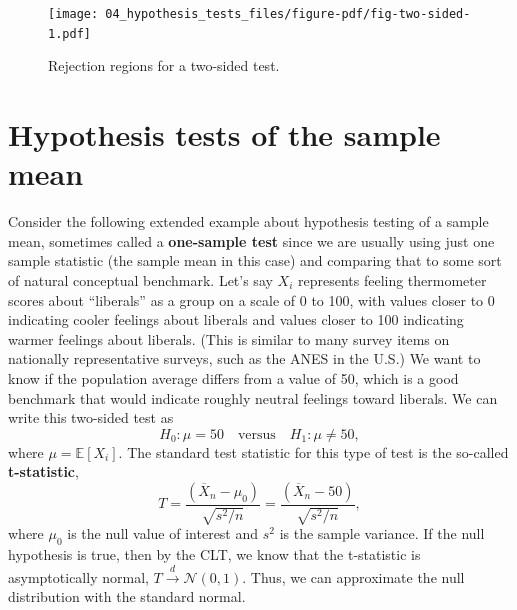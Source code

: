 \documentclass[
  letterpaper,
  DIV=11,
  numbers=noendperiod]{scrreprt}
\newcommand{\E}{\mathbb{E}}
\newcommand{\N}{\mathcal{N}}
\newcommand{\Xbar}{\overline{X}}
\newcommand{\indist}{\overset{d}{\to}}
\theoremstyle{definition}
\theoremstyle{definition}
\theoremstyle{plain}
\theoremstyle{remark}
\begin{document}
\begin{figure}

{\centering \texttt{[image: 04\_hypothesis\_tests\_files/figure-pdf/fig-two-sided-1.pdf]}

}

\caption{\label{fig-two-sided}Rejection regions for a two-sided test.}

\end{figure}

\hypertarget{hypothesis-tests-of-the-sample-mean}{%
\section{Hypothesis tests of the sample
mean}\label{hypothesis-tests-of-the-sample-mean}}

Consider the following extended example about hypothesis testing of a
sample mean, sometimes called a \textbf{one-sample test} since we are
usually using just one sample statistic (the sample mean in this case)
and comparing that to some sort of natural conceptual benchmark. Let's
say \(X_i\) represents feeling thermometer scores about ``liberals'' as
a group on a scale of 0 to 100, with values closer to 0 indicating
cooler feelings about liberals and values closer to 100 indicating
warmer feelings about liberals. (This is similar to many survey items on
nationally representative surveys, such as the ANES in the U.S.) We want
to know if the population average differs from a value of 50, which is a
good benchmark that would indicate roughly neutral feelings toward
liberals. We can write this two-sided test as \[
H_0: \mu = 50 \quad\text{versus}\quad H_1: \mu \neq 50,
\] where \(\mu = \E[X_i]\). The standard test statistic for this type of
test is the so-called \textbf{t-statistic}, \[ 
T = \frac{\left( \Xbar_n - \mu_0 \right)}{\sqrt{s^2 / n}} =\frac{\left( \Xbar_n - 50 \right)}{\sqrt{s^2 / n}},
\] where \(\mu_0\) is the null value of interest and \(s^2\) is the
sample variance. If the null hypothesis is true, then by the CLT, we
know that the t-statistic is asymptotically normal,
\(T \indist \N(0, 1)\). Thus, we can approximate the null distribution
with the standard normal.
\end{document}
